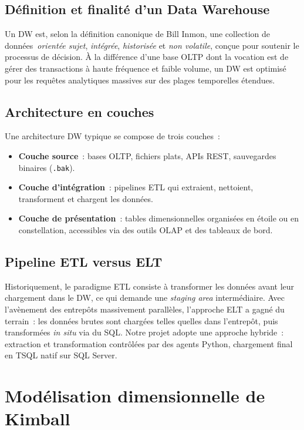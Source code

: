 \documentclass[12pt, a4paper]{report}
\begin{document}
\subsection{Définition et finalité d'un Data Warehouse}
Un \ac{DW} est, selon la définition canonique de Bill Inmon, une
collection de données~\textit{orientée sujet}, \textit{intégrée},
\textit{historisée} et \textit{non volatile}, conçue pour soutenir
le processus de décision. À la différence d'une base \ac{OLTP} dont la
vocation est de gérer des transactions à haute fréquence et faible
volume, un \ac{DW} est optimisé pour les requêtes analytiques massives
sur des plages temporelles étendues.

\subsection{Architecture en couches}
Une architecture \ac{DW} typique se compose de trois couches~:
\begin{itemize}
  \item \textbf{Couche source}~: bases \ac{OLTP}, fichiers plats,
        \acp{API} REST, sauvegardes binaires (\texttt{.bak}).
  \item \textbf{Couche d'intégration}~: pipelines \ac{ETL} qui
        extraient, nettoient, transforment et chargent les données.
  \item \textbf{Couche de présentation}~: tables dimensionnelles
        organisées en étoile ou en constellation, accessibles via
        des outils \ac{OLAP} et des tableaux de bord.
\end{itemize}

\subsection{Pipeline ETL versus ELT}
Historiquement, le paradigme \ac{ETL} consiste à transformer les
données avant leur chargement dans le \ac{DW}, ce qui demande une
\emph{staging area} intermédiaire. Avec l'avènement des entrepôts
massivement parallèles, l'approche \ac{ELT} a gagné du terrain~:
les données brutes sont chargées telles quelles dans l'entrepôt, puis
transformées \emph{in situ} via du \ac{SQL}. Notre projet adopte une
approche hybride~: extraction et transformation contrôlées par des
agents Python, chargement final en \ac{TSQL} natif sur SQL Server.

\section{Modélisation dimensionnelle de Kimball}
\label{sec:kimball}
\end{document}
